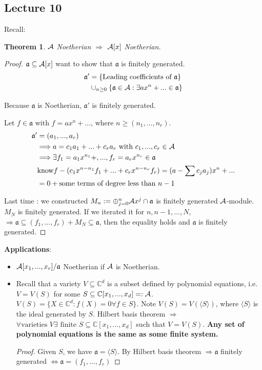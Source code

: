 \documentclass[11pt]{article}
\newtheorem{thm}{Theorem}[section]
\newcommand{\cplx}{\mathbb C}
\newcommand{\sca}{{\mathfrak a}}
\newcommand{\cala}{{\cal A}}
\newcommand{\Lrta}{\Longrightarrow}
\newcommand{\Llrta}{\Longleftrightarrow}
\newcommand{\lgl}{\langle}
\newcommand{\rgl}{\rangle}
\begin{document}
\subsection{Lecture 10}
Recall:
\begin{thm}
$\cala$ Noetherian $\Lrta $ $\cala[x]$ Noetherian.
\end{thm}
\begin{proof}
$\sca\subseteq \cala[x]$ want to show that $\sca$ is finitely generated. 
$$
\begin{aligned}
\sca' &=\{\text{Leading coefficients of $\sca$}\}\\
& \cup_{n\geq 0}\{\sca\in\cala: \exists a x^n+...\in \sca\}
\end{aligned}
$$


Because $\sca $ is Noetherian, $\sca'$ is finitely generated.

Let $f\in \sca$ with $f=ax^n+...$, where $n\geq (n_1,...,n_r)$.
$$
\begin{aligned}
\sca' &=(a_1,...,a_r)\\
&\Lrta a=c_1 a_1+...+c_r a_r\text{ with } c_1,...,c_r\in \cala\\
&\Lrta \exists f_1=a_1 x^{n_1}+,..., f_r=a_r x^{n_r}\in\sca\\
&\text{know} f-(c_1 x^{n-n_1}f_1+...+c_r x^{n-n_r}f_r)=(a-\sum c_j a_j)x^n+...\\
&=0+ \text{some terms of degree less than $n-1$}
\end{aligned}
$$

Last time : we constructed $M_n:=\oplus^n_{j=0}\cala x^j\cap \sca$ is finitely generated $\cala$-module. $M_N$ is finitely generated. If we iterated it for $n,n-1,...,N$, $\Lrta\sca\subseteq (f_1,...,f_r)+M_N\subseteq \sca$, then the equality holds and $\sca$ is finitely generated.
\end{proof}

\textbf{Applications}:
\begin{itemize}
    \item 
    $\cala[x_1,...,x_r]/\sca$ Noetherian if $\cala $ is Noetherian. 
    \item 
    Recall that  a variety $V\subseteq \cplx^d$ is a subset defined by polynomial equations, i.e.
    $V=V(S)$ for some $S\subseteq \cplx[x_1,...,x_d]=:\cala$. $V(S)=\{X\in \cplx^d:f(X)=0\forall f\in S\}$.
    Note $V(S)=V(\lgl S\rgl)$, where $\lgl S\rgl$ is the ideal generated by $S$. Hilbert basis theorem $\Lrta$ $\forall \text{varieties } V\exists \text{ finite } S\subseteq \cplx[x_1,...,x_d]$ such that $V=V(S)$. \textbf{Any set of polynomial equations is the same as some finite system.}
    \begin{proof}
    Given $S$, we have $\sca=\lgl S\rgl$. By Hilbert basis theorem $\Lrta\sca$ finitely generated $\Llrta\sca=(f_1,...,f_r)$
    \end{proof}
\end{itemize}
\end{document}
